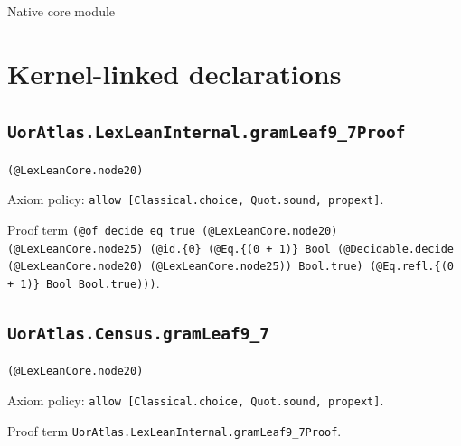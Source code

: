 \documentclass[11pt]{article}
\begin{document}
\begin{center}{\LARGE Native core module}\end{center}
\section*{Kernel-linked declarations}
\subsection*{\texttt{UorAtlas.LexLeanInternal.gramLeaf9\_7Proof}}
\noindent\texttt{(@LexLeanCore.node20)}\par
\noindent Axiom policy: \texttt{allow [Classical.choice, Quot.sound, propext]}.\par
\noindent Proof term \texttt{(@of\_decide\_eq\_true (@LexLeanCore.node20) (@LexLeanCore.node25) (@id.\{0\} (@Eq.\{(0 + 1)\} Bool (@Decidable.decide (@LexLeanCore.node20) (@LexLeanCore.node25)) Bool.true) (@Eq.refl.\{(0 + 1)\} Bool Bool.true)))}.\par
\subsection*{\texttt{UorAtlas.Census.gramLeaf9\_7}}
\noindent\texttt{(@LexLeanCore.node20)}\par
\noindent Axiom policy: \texttt{allow [Classical.choice, Quot.sound, propext]}.\par
\noindent Proof term \texttt{UorAtlas.LexLeanInternal.gramLeaf9\_7Proof}.\par
\end{document}
